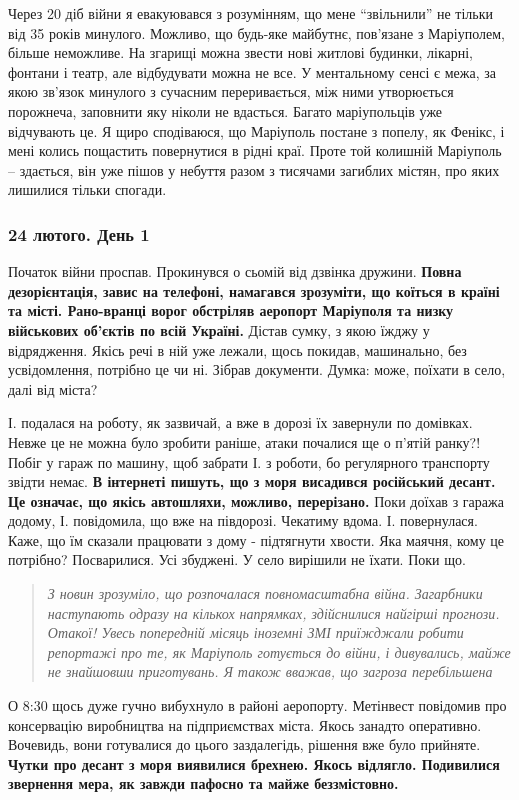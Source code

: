 
Через 20 діб війни я евакуювався з розумінням, що мене \enquote{звільнили} не тільки
від 35 років минулого. Можливо, що будь-яке майбутнє, пов'язане з Маріуполем,
більше неможливе. На згарищі можна звести нові житлові будинки, лікарні,
фонтани і театр, але відбудувати можна не все. У ментальному сенсі є межа, за
якою зв'язок минулого з сучасним переривається, між ними утворюється порожнеча,
заповнити яку ніколи не вдасться. Багато маріупольців уже відчувають це. Я щиро
сподіваюся, що Маріуполь постане з попелу, як Фенікс, і мені колись пощастить
повернутися в рідні краї. Проте той колишній Маріуполь – здається, він уже
пішов у небуття разом з тисячами загиблих містян, про яких лишилися тільки
спогади.
\endgroup

\subsubsection{24 лютого. День 1}

Початок війни проспав. Прокинувся о сьомій від дзвінка дружини. \textbf{Повна
дезорієнтація, завис на телефоні, намагався зрозуміти, що коїться в країні та
місті. Рано-вранці ворог обстріляв аеропорт Маріуполя та низку військових
об'єктів по всій Україні.} Дістав сумку, з якою їжджу у відрядження. Якісь речі
в ній уже лежали, щось покидав, машинально, без усвідомлення, потрібно це чи
ні. Зібрав документи. Думка: може, поїхати в село, далі від міста? 

І. подалася на роботу, як зазвичай, а вже в дорозі їх завернули по домівках.
Невже це не можна було зробити раніше, атаки почалися ще о п'ятій ранку?! Побіг
у гараж по машину, щоб забрати І. з роботи, бо регулярного транспорту звідти
немає. \textbf{В інтернеті пишуть, що з моря висадився російський десант. Це означає,
що якісь автошляхи, можливо, перерізано.} Поки доїхав з гаража додому, І.
повідомила, що вже на півдорозі. Чекатиму вдома. І. повернулася. Каже, що їм
сказали працювати з дому - підтягнути хвости. Яка маячня, кому це потрібно?
Посварилися. Усі збуджені. У село вирішили не їхати. Поки що.

\begin{quote}
\em\large
З новин зрозуміло, що розпочалася повномасштабна війна. Загарбники наступають
одразу на кількох напрямках, здійснилися найгірші прогнози. Отакої! Увесь
попередній місяць іноземні ЗМІ приїжджали робити репортажі про те, як Маріуполь
готується до війни, і дивувались, майже не знайшовши приготувань. Я також
вважав, що загроза перебільшена
\end{quote}

О 8:30 щось дуже гучно вибухнуло в районі аеропорту. Метінвест повідомив про
консервацію виробництва на підприємствах міста. Якось занадто оперативно.
Вочевидь, вони готувалися до цього заздалегідь, рішення вже було прийняте.
\textbf{Чутки про десант з моря виявилися брехнею. Якось відлягло. Подивилися звернення
мера, як завжди пафосно та майже беззмістовно.}
